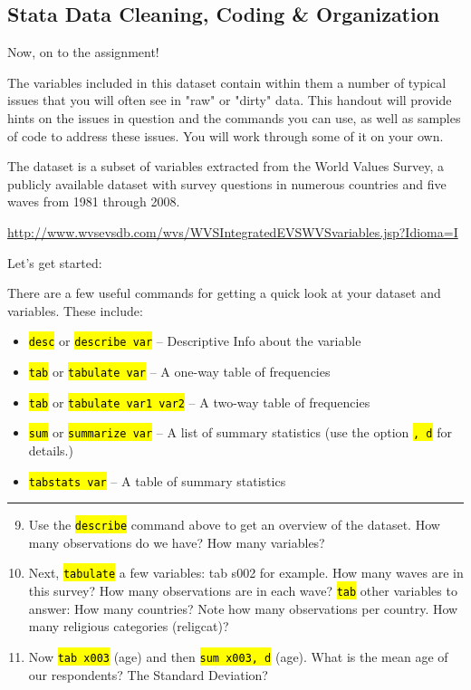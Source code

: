 \documentclass{tufte-handout}
\begin{document}
\subsection{Stata Data Cleaning, Coding \& Organization}

Now, on to the assignment!

The variables included in this dataset contain within them a number of typical issues that you will often see in "raw" or "dirty" data. This handout will provide hints on the issues in question and the commands you can use, as well as samples of code to address these issues.  You will work through some of it on your own.

The dataset is a subset of variables extracted from the World Values Survey, a publicly available dataset with survey questions in numerous countries and five waves from 1981 through 2008.

\url{http://www.wvsevsdb.com/wvs/WVSIntegratedEVSWVSvariables.jsp?Idioma=I}

Let's get started:

\medskip
{}
\medskip

There are a few useful commands for getting a quick look at your dataset and variables. These include:
\begin{itemize}
	\item {\tt \hl{desc}} or {\tt \hl{describe var}} -- Descriptive Info about the variable
	\item {\tt \hl{tab}} or {\tt \hl{tabulate var}} -- A one-way table of frequencies
	\item {\tt \hl{tab}} or {\tt \hl{tabulate var1 var2}} -- A two-way table of frequencies 
	\item {\tt \hl{sum}} or {\tt \hl{summarize var}} -- A list of summary statistics (use the option {\tt \hl{, d}} for details.)
	\item {\tt \hl{tabstats var}} -- A table of summary statistics
\end{itemize}

\bigskip
\hrule
\bigskip

\begin{enumerate}[leftmargin=.5in]
\setcounter{enumi}{8}
	\item Use the {\tt \hl{describe}} command above to get an overview of the dataset. How many observations do we have? How many variables?
	\item Next, {\tt \hl{tabulate}} a few variables: tab s002 for example. How many waves are in this survey? How many observations are in each wave? {\tt \hl{tab}} other variables to answer: How many countries? Note how many observations per country.  How many religious categories (religcat)?
	\item Now {\tt \hl{tab x003}} (age) and then {\tt \hl{sum x003, d}} (age). What is the mean age of our respondents? The Standard Deviation?
\end{enumerate}
\end{document}

